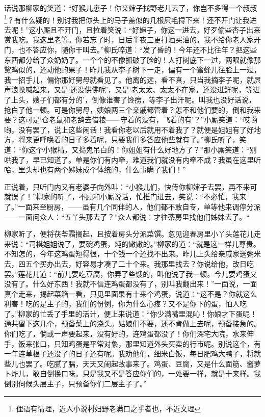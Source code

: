 \documentclass[12pt,oneside]{book}
\begin{document}
话说那柳家的笑道：“好猴儿崽子！你亲婶子找野老儿去了，你岂不多得一个叔叔\footnote{俚语有情理，近人小说村妇野老满口之乎者也，不近文理}？有什么疑的！别讨我把你头上的马子盖似的几根屄毛挦下来！还不开门让我进去呢！”这小厮且不开门，且拉着笑说：“好婶子，你这一进去，好歹偷些杏子出来赏我吃。我这里老等。你若忘了时，日后半夜三更打酒买油的，我不给你老人家开门，也不答应你，随你干叫去。”柳氏啐道︰“发了昏的！今年还不比往年？把这些东西都分给了众奶奶了。一个个的不像抓破了脸的！人打树底下一过，两眼就像那黧鸡似的，还动他的果子！昨儿我从李子树下一走，偏有一个蜜蜂儿往脸上一过，我一招手儿，偏你那好舅母就看见了。他离的远，看不真，只当我摘李子呢，就屄声浪嗓喊起来，又是‘还没供佛呢’，又是‘老太太、太太不在家，还没进鲜呢，等进了上头，嫂子们都有分的’，倒像谁害了馋痨，等李子出汗呢。叫我也没好话说，抢白了他一顿。可是你舅母，姨娘两三个亲戚都管着？怎不和他们要的，倒和我来要？这可是‘仓老鼠和老鸹去借粮——守着的没有，飞着的有’？”小厮笑道：“哎哟哟，没有罢了，说上这些闲话！我看你老以后就用不着我了？就便是姐姐有了好地方，将来更呼唤着的日子多着呢，只要我们多答应他些就有了。”柳氏听了，笑道：“你这个小猴精，又捣鬼吊白的！你姐姐有什么好地方了？”那小厮笑道：“别哄我了，早已知道了。单是你们有内牵，难道我们就没有内牵不成？我虽在这里听哈，里头却也有两个姊妹成个体统的，什么事瞒了我们！”

正说着，只听门内又有老婆子向外叫：“小猴儿们，快传你柳婶子去罢，再不来可就误了！”柳家的听了，不顾和小厮说话，忙推门进去，笑说：“不必忙，我来了。”一面来至厨房，——虽有几个同伴的人，他们都不敢自专，单等他来调停分派——一面问众人：“五丫头那去了？”众人都说︰才往茶房里找他们姊妹去了。“

柳家听了，便将茯苓霜搁起，且按着房头分派菜馔。忽见迎春房里小丫头莲花儿走来说：“司棋姐姐说了，要碗鸡蛋，炖的嫩嫩的。”柳家的道：“就是这一样儿尊贵。不知怎的，今年这鸡蛋短得很，十个钱一个还找不出来。昨儿上头给亲戚家送粥米去，四五个买办出去，好容易才凑了二十个来。我那里找去？你说给他，改日吃罢。”莲花儿道：“前儿要吃豆腐，你弄了些馊的，叫他说了我一顿。今儿要鸡蛋又没有了。什么好东西！我就不信连鸡蛋都没有了，别叫我翻出来！”一面说，一面真个走来，揭起菜箱一看，只见里面果有十来个鸡蛋，说道：“这不是？你就这么利害！吃的是主子的，我们的份例，你为什么心疼？又不是你下的蛋，怕人吃了。”柳家的忙丢了手里的活计，便上来说道：“你少满嘴里混吣！你娘才下蛋呢！通共留下这几个，预备菜上的浇头。姑娘们不要，还不肯做上去呢，预备接急的。你们吃了，倘或一声要起来，没有好的，连鸡蛋都没了！你们深宅大院，水来伸手，饭来张口，只知鸡蛋是平常对象，那里知道外头买卖的行市呢。别说这个，有一年连草根子还没了的日子还有呢。我劝他们，细米白饭，每日肥鸡大鸭子，将就些儿也罢了。吃腻了膈，天天又闹起故事来了。鸡蛋、豆腐，又是什么面筋、酱萝卜炸儿，敢自倒换口味。只是我又不是答应你们的，一处要一样，就是十来样。我倒别伺候头层主子，只预备你们二层主子了。”
\end{document}
